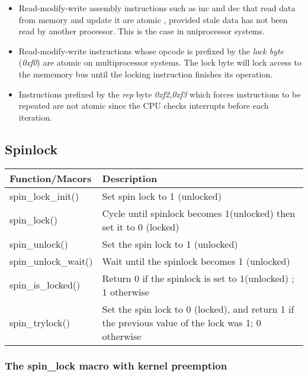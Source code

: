 \documentclass{article}
\begin{document}
\begin{itemize}
  \item Read-modify-write assembly instructions such as inc and dec
    that read data from memory and update it are atomic , provided
    stale data has not been read by another processor. This is the
    case in uniprocessor systems.

  \item Read-modify-write instructions whose opcode is prefixed by the
    \emph{lock byte} (\emph{0xf0}) are atomic on multiprocessor
    systems.  The lock byte will lock access to the mememory bus until
    the locking instruction finishes its operation.
  \item Instructions prefixed by the \emph{rep} byte \emph{0xf2,0xf3}
    which forces instructions to be repeated are not atomic since the
    CPU checks interrupts before each iteration.

\end{itemize}



\subsection{Spinlock}

  \begin{center}
  \begin{tabular}{ l | l }    
    \hline
    Function/Macors & Description \\ \hline
    spin\_lock\_init() & Set spin lock to 1 (unlocked) \\ 
    spin\_lock() & Cycle until spinlock becomes 1(unlocked) then set it to 0 (locked) \\ 
    spin\_unlock() & Set the spin lock to 1 (unlocked) \\
    spin\_unlock\_wait() & Wait until the spinlock becomes 1 (unlocked)  \\
    spin\_is\_locked() & Return 0 if the spinlock is set to 1(unlocked) ; 1 otherwise  \\
    spin\_trylock() &  Set the spin lock to 0 (locked), and return 1 if the previous value of the lock was 1; 0 otherwise\\
    \hline
  \end{tabular}
  \end{center}

  \subsubsection{The spin\_lock macro with kernel preemption}
\end{document}
